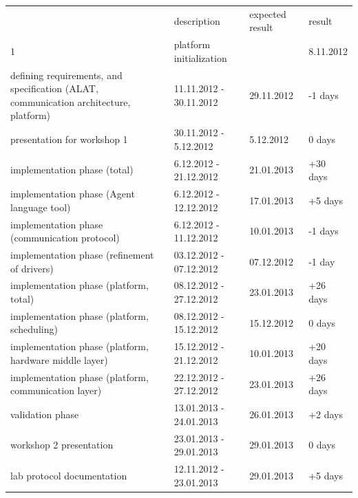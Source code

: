 \documentclass{scrreprt}
\begin{document}
\vspace{0.2in}
\begin{tabular}{>{\raggedright}m{5cm}|>{\raggedright}m{5cm}|l|l|}
\hline \multicolumn{4}{|c|}{\textbf{Overall system validation}}\\
\hline
			& description & expected result		& result	\\\hline
1	&
 platform initialization
&  		& 8.11.2012	 		\\\hline

defining requirements, and specification (ALAT, communication architecture, platform)
&  11.11.2012 - 30.11.2012		& 29.11.2012	 	& -1 days	\\\hline

presentation for workshop 1
&  30.11.2012 - 5.12.2012			& 5.12.2012	 	& 0 days	\\\hline

implementation phase (total)
&  6.12.2012 - 21.12.2012			& 21.01.2013	 	& +30 days	\\\hline

implementation phase (Agent language tool)
&  6.12.2012 - 12.12.2012			& 17.01.2013	 	& +5 days	\\\hline

implementation phase (communication protocol)
&  6.12.2012 - 11.12.2012			& 10.01.2013	 	& -1 days	\\\hline

implementation phase (refinement of drivers)
&  03.12.2012 - 07.12.2012			& 07.12.2012	 	& -1 day	\\\hline

implementation phase (platform, total)
&  08.12.2012 - 27.12.2012			& 23.01.2013	 	& +26 days	\\\hline

implementation phase (platform, scheduling)
&  08.12.2012 - 15.12.2012			& 15.12.2012	 	& 0 days	\\\hline

implementation phase (platform, hardware middle layer)
&  15.12.2012 - 21.12.2012			& 10.01.2013	 	& +20 days	\\\hline

implementation phase (platform, communication layer)
&  22.12.2012 - 27.12.2012			& 23.01.2013	 	& +26 days	\\\hline

validation phase
&  13.01.2013 - 24.01.2013			& 26.01.2013	 	& +2 days	\\\hline

workshop 2 presentation
&  23.01.2013 - 29.01.2013			& 29.01.2013	 	& 0 days	\\\hline

lab protocol documentation
&  12.11.2012 - 23.01.2013			& 29.01.2013	 	& +5 days	\\\hline

\hline
\end{tabular}
\end{document}
